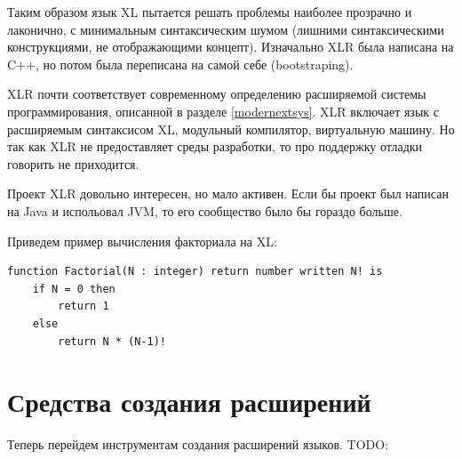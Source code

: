 \documentclass[a4paper,12pt,titlepage]{extarticle}
\begin{document}
Таким образом язык XL пытается решать проблемы наиболее прозрачно и лаконично, с
минимальным синтаксическим шумом (лишними синтаксическими конструкциями, не
отображающими концепт).
Изначально XLR была написана на C++, но потом была переписана на самой себе
(bootstraping).

XLR почти соответствует современному определению расширяемой системы
программирования, описанной в разделе \ref{modernextsys}. XLR включает язык с
расширяемым синтаксисом XL, модульный компилятор, виртуальную машину. Но так как
XLR не предоставляет среды разработки, то про поддержку отладки говорить не
приходится.

Проект XLR довольно интересен, но мало активен. Если бы проект был написан на
Java и испольовал JVM, то его сообщество было бы гораздо больше.

Приведем пример вычисления факториала на XL:
\begin{verbatim}
function Factorial(N : integer) return number written N! is
    if N = 0 then
        return 1
    else
        return N * (N-1)!
\end{verbatim}

\section{Средства создания расширений}
\label{tools}

Теперь перейдем инструментам создания расширений языков.
TODO:
\end{document}
